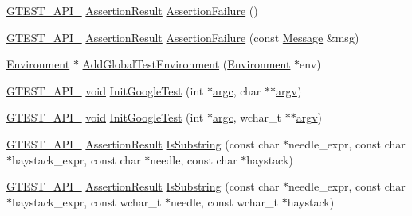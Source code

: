 \begin{DoxyCompactItemize}
\item 
\hyperlink{ts__gtest_8h_aa73be6f0ba4a7456180a94904ce17790}{G\-T\-E\-S\-T\-\_\-\-A\-P\-I\-\_\-} \hyperlink{classtesting_1_1AssertionResult}{Assertion\-Result} \hyperlink{namespacetesting_a8d91083190a5914bfe8c5666e2dbca9b}{Assertion\-Failure} ()
\item 
\hyperlink{ts__gtest_8h_aa73be6f0ba4a7456180a94904ce17790}{G\-T\-E\-S\-T\-\_\-\-A\-P\-I\-\_\-} \hyperlink{classtesting_1_1AssertionResult}{Assertion\-Result} \hyperlink{namespacetesting_aed37b5c1db949665e4022cb4740d86c2}{Assertion\-Failure} (const \hyperlink{classtesting_1_1Message}{Message} \&msg)
\item 
\hyperlink{classtesting_1_1Environment}{Environment} $\ast$ \hyperlink{namespacetesting_a460d7b998622e332392c1e00be3a60d5}{Add\-Global\-Test\-Environment} (\hyperlink{classtesting_1_1Environment}{Environment} $\ast$env)
\item 
\hyperlink{ts__gtest_8h_aa73be6f0ba4a7456180a94904ce17790}{G\-T\-E\-S\-T\-\_\-\-A\-P\-I\-\_\-} \hyperlink{legacy_8hpp_a8bb47f092d473522721002c86c13b94e}{void} \hyperlink{namespacetesting_aee3f6f99df893f576f705f66c0559482}{Init\-Google\-Test} (int $\ast$\hyperlink{highgui__c_8h_a4ee2a7de047a0a236fe118a35e8f76a4}{argc}, char $\ast$$\ast$\hyperlink{highgui__c_8h_a1b5d2a82062528707ab3855772528912}{argv})
\item 
\hyperlink{ts__gtest_8h_aa73be6f0ba4a7456180a94904ce17790}{G\-T\-E\-S\-T\-\_\-\-A\-P\-I\-\_\-} \hyperlink{legacy_8hpp_a8bb47f092d473522721002c86c13b94e}{void} \hyperlink{namespacetesting_a6e9d83553f1d10818d698d45689d8adb}{Init\-Google\-Test} (int $\ast$\hyperlink{highgui__c_8h_a4ee2a7de047a0a236fe118a35e8f76a4}{argc}, wchar\-\_\-t $\ast$$\ast$\hyperlink{highgui__c_8h_a1b5d2a82062528707ab3855772528912}{argv})
\item 
\hyperlink{ts__gtest_8h_aa73be6f0ba4a7456180a94904ce17790}{G\-T\-E\-S\-T\-\_\-\-A\-P\-I\-\_\-} \hyperlink{classtesting_1_1AssertionResult}{Assertion\-Result} \hyperlink{namespacetesting_a5c90a86562b2470213c07742e0eeb0fe}{Is\-Substring} (const char $\ast$needle\-\_\-expr, const char $\ast$haystack\-\_\-expr, const char $\ast$needle, const char $\ast$haystack)
\item 
\hyperlink{ts__gtest_8h_aa73be6f0ba4a7456180a94904ce17790}{G\-T\-E\-S\-T\-\_\-\-A\-P\-I\-\_\-} \hyperlink{classtesting_1_1AssertionResult}{Assertion\-Result} \hyperlink{namespacetesting_a08ce65847491b27a38cbac3ac15e3035}{Is\-Substring} (const char $\ast$needle\-\_\-expr, const char $\ast$haystack\-\_\-expr, const wchar\-\_\-t $\ast$needle, const wchar\-\_\-t $\ast$haystack)

\end{DoxyCompactItemize}
